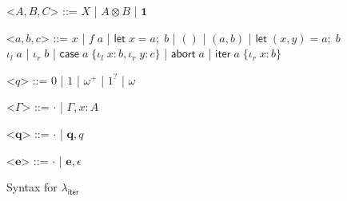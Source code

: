 \documentclass[acmsmall,screen,review]{acmart}
\newcommand{\mb}[1]{\ensuremath{\mathbf{#1}}}
\newcommand{\ms}[1]{\ensuremath{\mathsf{#1}}}
\newcommand{\lto}{:}
\newcommand{\linl}[1]{\iota_l\;{#1}}
\newcommand{\linr}[1]{\iota_r\;{#1}}
\newcommand{\labort}[1]{\ms{abort}\;{#1}}
\newcommand{\letexpr}[3]{\ensuremath{\ms{let}\;#1 = #2;\;#3}}
\newcommand{\caseexpr}[5]{\ms{case}\;#1\;\{\linl{#2} \lto #3, \linr{#4} \lto #5\}}
\newcommand{\liter}[3]{\ms{iter}\;#1\;\{ \linr{#2} \lto #3 \}}
\newcommand{\subiterssa}{\(\lambda_{\ms{iter}}\)}
\newcommand{\zeroq}{0}
\newcommand{\oneq}{1}
\newcommand{\delq}{1^?}
\newcommand{\cpyq}{\omega^+}
\newcommand{\topq}{\omega}
\begin{document}
\begin{figure}
  \begin{grammar}
    <\(A, B, C\)> ::= 
    \(X\)
    \;|\; \(A \otimes B\)
    \;|\; \(\mathbf{1}\)

    <\(a, b, c\)> ::=
    \(x\)
    \;|\; \(f\;a\)
    \;|\; \(\letexpr{x}{a}{b}\)
    \;|\; \(()\)
    \;|\; \((a, b)\)
    \;|\; \(\letexpr{(x, y)}{a}{b}\)
    \alt  \(\linl{a}\)
    \;|\; \(\linr{b}\)
    \;|\; \(\caseexpr{a}{x}{b}{y}{c}\)
    \;|\; \(\labort{a}\)
    \;|\; \(\liter{a}{x}{b}\)
    
    <\(q\)> ::= \(\zeroq\) | \(\oneq\) | \(\cpyq\) | \(\delq\) | \(\topq\)

    <\(\Gamma\)> ::= \(\cdot\) \;|\; \(\Gamma, x : A\)

    <\(\mb{q}\)> ::= \(\cdot\) \;|\; \(\mb{q}, q\)

    <\(\mb{e}\)> ::= \(\cdot\) \;|\; \(\mb{e}, \epsilon\)
  \end{grammar}
  \caption{Syntax for \subiterssa}
  \label{fig:subiterssa-syntax}
\end{figure}
\end{document}
